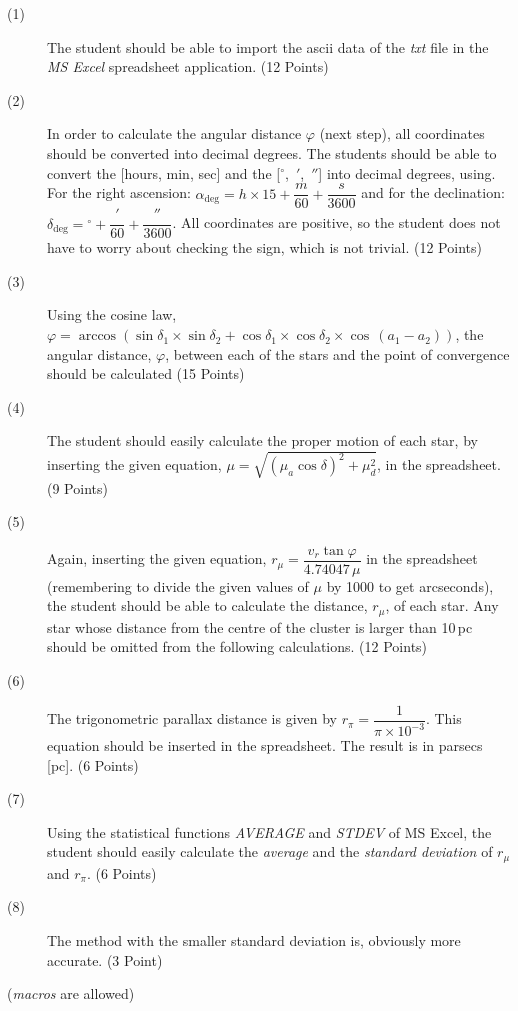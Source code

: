 \begin{description}
\item[(1)] The student should be able to import the ascii data of the
  \emph{txt} file in the \emph{MS Excel} spreadsheet application.
  \hfill(12 Points)
\item[(2)] In order to calculate the angular distance $\varphi$ (next step),
  all coordinates should be converted into decimal degrees. The students
  should be able to convert the [hours, min, sec] and the
  [$^\circ$,\ $'$,\ $''$] into decimal degrees, using. %
  For the right ascension:
  $\alpha_{\deg} = h\times15 + \dfrac{m}{60} + \dfrac{s}{3600}$
  and for the declination:
  $\delta_{\deg} = {}^\circ + \dfrac{'}{60} + \dfrac{''}{3600}$.
  All coordinates are positive, so the student does not have to worry about
  checking the sign, which is not trivial. \hfill(12 Points)
\item[(3)] Using the cosine law,
  $\varphi = \arccos(\sin\delta_1\times\sin\delta_2
    + \cos\delta_1\times\cos\delta_2\times\cos\,(a_1 - a_2))$,
  the angular distance, $\varphi$, between each of the stars and the point of
  convergence should be calculated \hfill(15 Points)
\item[(4)] The student should easily calculate the proper motion of each
  star, by inserting the given equation,
  $\mu = \sqrt{(\mu_a\cos\delta)^2 + \mu_d^2}$, in the spreadsheet.
  \hfill(9 Points)
\item[(5)] Again, inserting the given equation,
  $r_\mu = \dfrac{v_r\tan\varphi}{4.74047\,\mu}$ in the spreadsheet
  (remembering to divide the given values of $\mu$ by 1000 to get arcseconds),
  the student should be able to calculate the distance, $r_\mu$, of each star.
  Any star whose distance from the centre of the cluster is larger than
  10\,pc should be omitted from the following calculations. \hfill(12 Points)
\item[(6)] The trigonometric parallax distance is given by
  $r_\pi = \dfrac{1}{\pi\times10^{-3}}$. This equation should be inserted in
  the spreadsheet. The result is in parsecs [pc]. \hfill(6 Points)
\item[(7)] Using the statistical functions \emph{AVERAGE} and \emph{STDEV} of
  MS Excel, the student should easily calculate the \emph{average} and the
  \emph{standard deviation} of $r_\mu$ and $r_\pi$. \hfill(6 Points)
\item[(8)] The method with the smaller standard deviation is, obviously more
  accurate. \hfill(3 Point)
\end{description}

(\emph{macros} are allowed)
